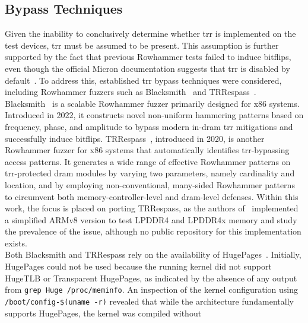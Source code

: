     \subsection{Bypass Techniques} \label{subsec:bypass-techniques}
        Given the inability to conclusively determine whether \gls{trr} is implemented on the test devices, \gls{trr} 
        must be assumed to be present. This assumption is further supported by the fact that previous 
        Rowhammer tests failed to induce bitflips, even though the official Micron documentation suggests 
        that \gls{trr} is disabled by default~\cite{datasheetLPDDR4}. To address this, established \gls{trr} bypass techniques were 
        considered, including Rowhammer fuzzers such as Blacksmith~\cite{toolBlacksmith} and TRRespass~\cite{toolTRRespass}.
        \\
        Blacksmith~\cite{paperBlacksmith} is a scalable Rowhammer fuzzer primarily designed for x86 systems. Introduced 
        in 2022, it constructs novel non-uniform hammering patterns based on frequency, phase, and 
        amplitude to bypass modern in-\gls{dram} \gls{trr} mitigations and successfully induce bitflips. TRRespass~\cite{paperTRRespass},
        introduced in 2020, is another Rowhammer fuzzer for x86 systems that automatically 
        identifies \gls{trr}-bypassing access patterns. It generates a wide range of effective Rowhammer patterns 
        on \gls{trr}-protected \gls{dram} modules by varying two parameters, namely cardinality and location, and by 
        employing non-conventional, many-sided Rowhammer patterns to circumvent both memory-controller-level 
        and \gls{dram}-level defenses. Within this work, the focus is placed on porting TRRespass, as the 
        authors of~\cite{paperTRRespass} implemented a simplified ARMv8 version to test LPDDR4 and LPDDR4x memory and 
        study the prevalence of the issue, although no public repository for this implementation exists.
        \\
        Both Blacksmith and TRRespass rely on the availability of HugePages~\cite{webHugePagesRPi4, toolMemoryAware, webHugepagesDebian}. Initially, 
        HugePages could not be used because the running kernel did not support HugeTLB or Transparent 
        HugePages, as indicated by the absence of any output from \texttt{grep Huge /proc/meminfo}. An 
        inspection of the kernel configuration using \texttt{/boot/config-\$(uname -r)} revealed that 
        while the architecture fundamentally supports HugePages, the kernel was compiled without 
